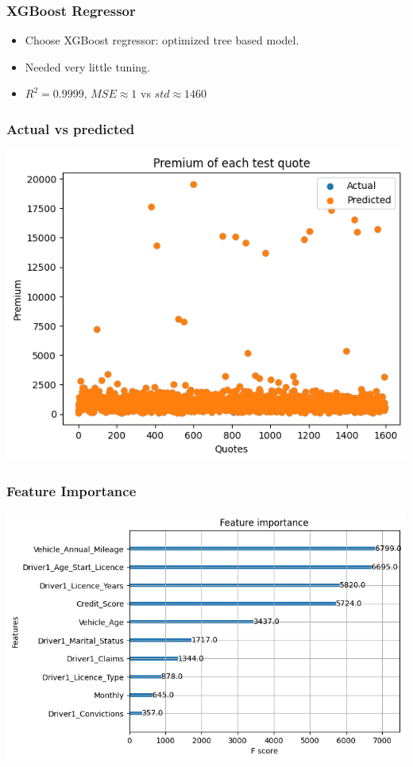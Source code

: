\documentclass{beamer}
\theoremstyle{definition}
\begin{document}
\begin{frame}
\frametitle{XGBoost Regressor}
\begin{itemize}
\item<1-> Choose XGBoost regressor: optimized tree based model.
\item<2-> Needed very little tuning.
\item<3-> $R^2=0.9999$, $MSE\approx 1$ vs $std\approx 1460$
\end{itemize}
\end{frame}

\begin{frame}
\frametitle{Actual vs predicted}
\begin{center}
\includegraphics[scale=0.55]{singledrivers} %
\end{center}
\end{frame}

\begin{frame}
\frametitle{Feature Importance}
\begin{center}
\includegraphics[scale=0.55]{singleimportance}
\end{center}
\end{frame}
\end{document}
